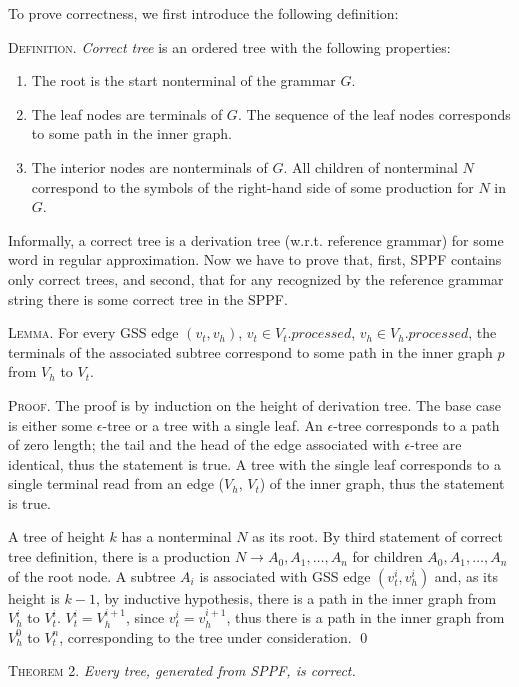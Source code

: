 To prove correctness, we first introduce the following definition:

\textsc{Definition.} 
\emph{Correct tree} is an ordered tree with the following properties:
\begin{enumerate}
  \item The root is the start nonterminal of the grammar $G$.
  \item The leaf nodes are terminals of $G$. The sequence of the leaf nodes 
        corresponds to some path in the inner graph. 
  \item The interior nodes are nonterminals of $G$. All children of nonterminal 
        $N$ correspond to the symbols of the right-hand side of some production for $N$ in $G$.
\end{enumerate}

Informally, a correct tree is a derivation tree (w.r.t. reference grammar) for some word in 
regular approximation. Now we have to prove that, first, SPPF contains only correct trees, 
and second, that for any recognized by the reference grammar string there is some correct tree in
the SPPF.

\textsc{Lemma.}
For every GSS edge $(v_{t}, v_{h})$, $v_{t} \in V_{t}.processed$, $v_{h} \in V_{h}.processed$, 
the terminals of the associated subtree correspond to some path in the inner graph $p$ 
from $V_{h}$ to $V_{t}$.

\textsc{Proof.}
The proof is by induction on the height of derivation tree. 
The base case is either some $\epsilon$-tree or a tree with a single leaf. An $\epsilon$-tree corresponds 
to a path of zero length; the tail and the head of the edge associated with $\epsilon$-tree are identical, 
thus the statement is true. A tree with the single leaf corresponds to a single terminal read from an edge 
($V_{h}$, $V_{t}$) of the inner graph, thus the statement is true.

A tree of height $k$ has a nonterminal $N$ as its root. By third statement of correct tree definition, 
there is a production $N \rightarrow A_{0}, A_{1}, \dots, A_{n}$ for children $A_{0}, A_{1}, \dots, A_{n}$ of the root node. 
A subtree $A_{i}$ is associated with GSS edge $(v_{t}^{i}, v_{h}^{i})$ and, as its height is $k-1$, by inductive hypothesis,
there is a path in the inner graph from $V_{h}^{i}$ to $V_{t}^{i}$. $V_{t}^i = V_{h}^{i+1}$, since $v_{t}^i = v_{h}^{i+1}$, 
thus there is a path in the inner graph from $V_{h}^{0}$ to $V_{t}^{n}$, corresponding to the tree under consideration.
\qed

\textsc{Theorem 2.} 
\textit{Every tree, generated from SPPF, is correct.}

